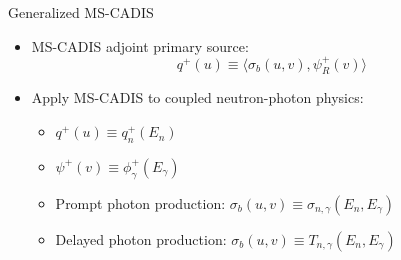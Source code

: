 \documentclass{beamer}
\begin{document}
\begin{frame}{Generalized MS-CADIS}
\begin{itemize}
\item{MS-CADIS adjoint primary source:}
\begin{equation}
  q^{+}(u) \equiv \langle \sigma_b(u,v) , \psi_R^{+}(v) \rangle
\end{equation}
\item{Apply MS-CADIS to coupled neutron-photon physics:}
	\begin{itemize}
		\item{$q^+(u) \equiv q_n^+(E_n)$}
			\vspace{0.1cm}
		\item{$\psi^+(v) \equiv \phi_{\gamma}^+(E_{\gamma})$}
			\vspace{0.1cm}
	\item{Prompt photon production: $\sigma_b(u,v) \equiv \sigma_{n,\gamma}(E_n,
	E_{\gamma})$}
			\vspace{0.1cm}
	\item{Delayed photon production: $\sigma_b(u,v) \equiv 
	T_{n,\gamma}(E_n,E_{\gamma})$}
	\end{itemize}

\end{itemize}
\end{frame}

%
		
\end{document}
